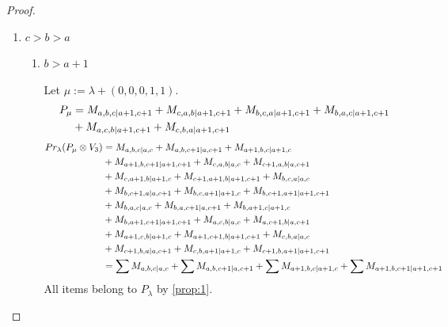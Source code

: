 \begin{proof}
\begin{enumerate}
    \item $c>b>a$
      \begin{enumerate}
        \item $b>a+1$ \par
        Let $\mu:=\lambda + (0,0,0,1,1) $.
        \begin{equation}\notag
          \begin{aligned}
            P_\mu &= M_{a,b,c|a+1,c+1}
+ M_{c,a,b|a+1,c+1}
+ M_{b,c,a|a+1,c+1}
+ M_{b,a,c|a+1,c+1}\\
                                               &
+ M_{a,c,b|a+1,c+1}
+ M_{c,b,a|a+1,c+1}
          \end{aligned}
        \end{equation}
        \begin{equation}\notag
          \begin{aligned}
            Pr_{\lambda}(P_\mu \otimes V_{3}) &=
M_{a,b,c|a,c}
+ M_{a,b,c+1|a,c+1}
+ M_{a+1,b,c|a+1,c}\\
                                               &
+ M_{a+1,b,c+1|a+1,c+1}
+ M_{c,a,b|a,c}
+ M_{c+1,a,b|a,c+1}\\
                                               &
+ M_{c,a+1,b|a+1,c}
+ M_{c+1,a+1,b|a+1,c+1}
+ M_{b,c,a|a,c}\\
                                               &
+ M_{b,c+1,a|a,c+1}
+ M_{b,c,a+1|a+1,c}
+ M_{b,c+1,a+1|a+1,c+1}\\
                                               &
+ M_{b,a,c|a,c}
+ M_{b,a,c+1|a,c+1}
+ M_{b,a+1,c|a+1,c}\\
                                               &
+ M_{b,a+1,c+1|a+1,c+1}
+ M_{a,c,b|a,c}
+ M_{a,c+1,b|a,c+1}\\
                                               &
+ M_{a+1,c,b|a+1,c}
+ M_{a+1,c+1,b|a+1,c+1}
+ M_{c,b,a|a,c}\\
                                               &
+ M_{c+1,b,a|a,c+1}
+ M_{c,b,a+1|a+1,c}
+ M_{c+1,b,a+1|a+1,c+1} \\
                                               &=
\sum M_{a,b,c|a,c}
+ \sum M_{a,b,c+1|a,c+1}
+ \sum M_{a+1,b,c|a+1,c}
+ \sum M_{a+1,b,c+1|a+1,c+1}
          \end{aligned}
        \end{equation}
All items belong to $P_\lambda$ by \cref{prop:1}.


\end{enumerate}
\end{enumerate}
\end{proof}
